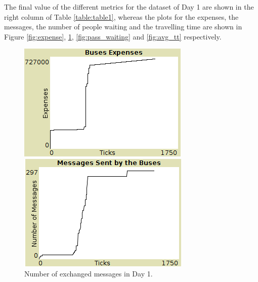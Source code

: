 The final value of the different metrics for the dataset of Day 1 are shown in the right column of Table \ref{table:table1}, whereas the plots for the expenses, the messages, the number of people waiting and the travelling time are shown in Figure \ref{fig:expense}, \ref{fig:messages}, \ref{fig:pass_waiting} and \ref{fig:avg_tt} respectively.

\begin{figure}[htbp]
\centering
\begin{minipage}{.48\textwidth}
  \includegraphics[width=\textwidth]{src/expenses.png}
  \caption{Expenses of the buses in Day 1.}
  \label{fig:expense}
\end{minipage}
\begin{minipage}{.48\textwidth}
  \includegraphics[width=\textwidth]{src/nr_messages.png}
  \caption{Number of exchanged messages in Day 1.}
  \label{fig:messages}
\end{minipage}
\end{figure}

